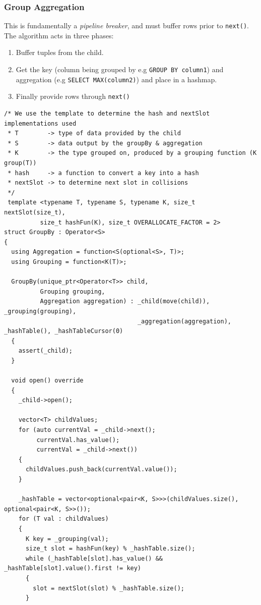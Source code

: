 \subsubsection{Group Aggregation}
This is fundamentally a \textit{pipeline breaker}, and must buffer rows prior to \texttt{next()}.
The algorithm acts in three phases:
\begin{enumerate}
  \item Buffer tuples from the child.
  \item Get the key (column being grouped by e.g \texttt{GROUP BY column1}) and aggregation (e.g \texttt{SELECT MAX(column2)}) and place in a hashmap.
  \item Finally provide rows through \texttt{next()}
\end{enumerate}
\begin{verbatim}
/* We use the template to determine the hash and nextSlot implementations used
 * T        -> type of data provided by the child
 * S        -> data output by the groupBy & aggregation
 * K        -> the type grouped on, produced by a grouping function (K group(T))
 * hash     -> a function to convert a key into a hash
 * nextSlot -> to determine next slot in collisions
 */
 template <typename T, typename S, typename K, size_t nextSlot(size_t),
          size_t hashFun(K), size_t OVERALLOCATE_FACTOR = 2>
struct GroupBy : Operator<S>
{
  using Aggregation = function<S(optional<S>, T)>;
  using Grouping = function<K(T)>;

  GroupBy(unique_ptr<Operator<T>> child,
          Grouping grouping,
          Aggregation aggregation) : _child(move(child)), _grouping(grouping),
                                     _aggregation(aggregation), _hashTable(), _hashTableCursor(0)
  {
    assert(_child);
  }

  void open() override
  {
    _child->open();

    vector<T> childValues;
    for (auto currentVal = _child->next();
         currentVal.has_value();
         currentVal = _child->next())
    {
      childValues.push_back(currentVal.value());
    }

    _hashTable = vector<optional<pair<K, S>>>(childValues.size(), optional<pair<K, S>>());
    for (T val : childValues)
    {
      K key = _grouping(val);
      size_t slot = hashFun(key) % _hashTable.size();
      while (_hashTable[slot].has_value() && _hashTable[slot].value().first != key)
      {
        slot = nextSlot(slot) % _hashTable.size();
      }


\end{verbatim}
